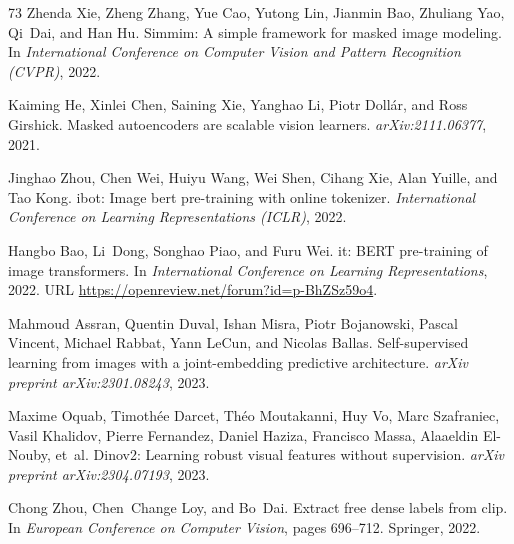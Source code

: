 \documentclass{article}
\begin{document}
\begin{thebibliography}{73}
Zhenda Xie, Zheng Zhang, Yue Cao, Yutong Lin, Jianmin Bao, Zhuliang Yao,
  Qi~Dai, and Han Hu.
\newblock Simmim: A simple framework for masked image modeling.
\newblock In \emph{International Conference on Computer Vision and Pattern
  Recognition (CVPR)}, 2022.

Kaiming He, Xinlei Chen, Saining Xie, Yanghao Li, Piotr Doll{\'a}r, and Ross
  Girshick.
\newblock Masked autoencoders are scalable vision learners.
\newblock \emph{arXiv:2111.06377}, 2021.

Jinghao Zhou, Chen Wei, Huiyu Wang, Wei Shen, Cihang Xie, Alan Yuille, and Tao
  Kong.
\newblock ibot: Image bert pre-training with online tokenizer.
\newblock \emph{International Conference on Learning Representations (ICLR)},
  2022{}.

Hangbo Bao, Li~Dong, Songhao Piao, and Furu Wei.
it: {BERT} pre-training of image transformers.
\newblock In \emph{International Conference on Learning Representations}, 2022.
\newblock URL \url{https://openreview.net/forum?id=p-BhZSz59o4}.

Mahmoud Assran, Quentin Duval, Ishan Misra, Piotr Bojanowski, Pascal Vincent,
  Michael Rabbat, Yann LeCun, and Nicolas Ballas.
\newblock Self-supervised learning from images with a joint-embedding
  predictive architecture.
\newblock \emph{arXiv preprint arXiv:2301.08243}, 2023.

Maxime Oquab, Timoth{\'e}e Darcet, Th{\'e}o Moutakanni, Huy Vo, Marc
  Szafraniec, Vasil Khalidov, Pierre Fernandez, Daniel Haziza, Francisco Massa,
  Alaaeldin El-Nouby, et~al.
\newblock Dinov2: Learning robust visual features without supervision.
\newblock \emph{arXiv preprint arXiv:2304.07193}, 2023.

Chong Zhou, Chen~Change Loy, and Bo~Dai.
\newblock Extract free dense labels from clip.
\newblock In \emph{European Conference on Computer Vision}, pages 696--712.
  Springer, 2022{}.


\end{thebibliography}
\end{document}
